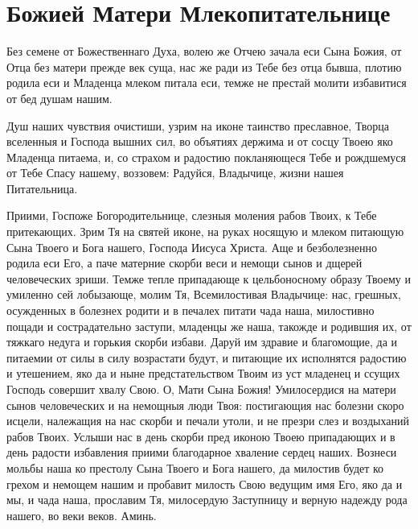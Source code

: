 \section{Божией Матери Млекопитательнице}\begin{mymulticols}




Без семене от Божественнаго Духа, волею же Отчею зачала еси Сына Божия, от Отца без матери прежде век суща, нас же ради из Тебе без отца бывша, плотию родила еси и Младенца млеком питала еси, темже не престай молити избавитися от бед душам нашим.




Душ наших чувствия очистиши, узрим на иконе таинство преславное, Творца вселенныя и Господа вышних сил, во объятиях держима и от сосцу Твоею яко Младенца питаема, и, со страхом и радостию покланяющеся Тебе и рождшемуся от Тебе Спасу нашему, воззовем: Радуйся, Владычице, жизни нашея Питательница.



Приими, Госпоже Богородительнице, слезныя моления рабов Твоих, к Тебе притекающих. Зрим Тя на святей иконе, на руках носящую и млеком питающую Сына Твоего и Бога нашего, Господа Иисуса Христа. Аще и безболезненно родила еси Его, а паче матерние скорби веси и немощи сынов и дщерей человеческих зриши. Темже тепле припадающе к цельбоносному образу Твоему и умиленно сей лобызающе, молим Тя, Всемилостивая Владычице: нас, грешных, осужденных в болезнех родити и в печалех питати чада наша, милостивно пощади и сострадательно заступи, младенцы же наша, такожде и родившия их, от тяжкаго недуга и горькия скорби избави. Даруй им здравие и благомощие, да и питаемии от силы в силу возрастати будут, и питающие их исполнятся радостию и утешением, яко да и ныне предстательством Твоим из уст младенец и ссущих Господь совершит хвалу Свою. О, Мати Сына Божия! Умилосердися на матери сынов человеческих и на немощныя люди Твоя: постигающия нас болезни скоро исцели, належащия на нас скорби и печали утоли, и не презри слез и воздыханий рабов Твоих. Услыши нас в день скорби пред иконою Твоею припадающих и в день радости избавления приими благодарное хваление сердец наших. Вознеси мольбы наша ко престолу Сына Твоего и Бога нашего, да милостив будет ко грехом и немощем нашим и пробавит милость Свою ведущим имя Его, яко да и мы, и чада наша, прославим Тя, милосердую Заступницу и верную надежду рода нашего, во веки веков. Аминь.

\end{mymulticols}


